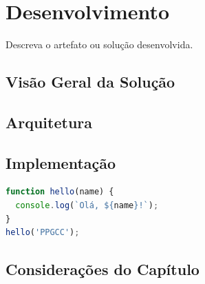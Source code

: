 
\chapter{Desenvolvimento}
\label{cap:desenvolvimento}

Descreva o artefato ou solução desenvolvida.

\section{Visão Geral da Solução}

\section{Arquitetura}

\section{Implementação}

\begin{lstlisting}[language=JavaScript, caption={Exemplo de código}, label={lst:exemplo}]
function hello(name) {
  console.log(`Olá, ${name}!`);
}
hello('PPGCC');
\end{lstlisting}

\section{Considerações do Capítulo}
